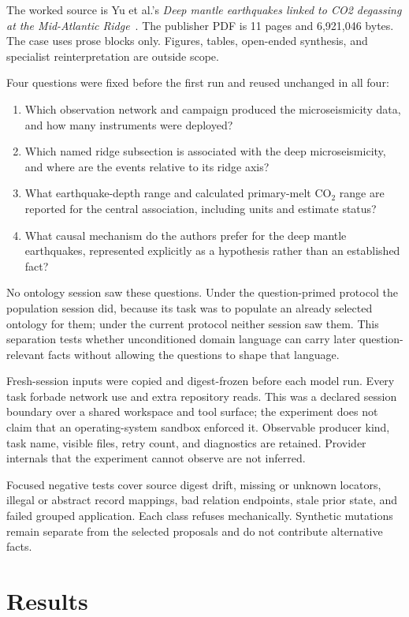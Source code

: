 \documentclass[10pt]{article}
\begin{document}
The worked source is Yu et al.'s \emph{Deep mantle earthquakes linked to CO2 degassing at the Mid-Atlantic Ridge}~\citep{yu2025deep}. The publisher PDF is 11 pages and 6,921,046 bytes. The case uses prose blocks only. Figures, tables, open-ended synthesis, and specialist reinterpretation are outside scope.

Four questions were fixed before the first run and reused unchanged in all four:
\begin{enumerate}
\item Which observation network and campaign produced the microseismicity data, and how many instruments were deployed?
\item Which named ridge subsection is associated with the deep microseismicity, and where are the events relative to its ridge axis?
\item What earthquake-depth range and calculated primary-melt CO$_2$ range are reported for the central association, including units and estimate status?
\item What causal mechanism do the authors prefer for the deep mantle earthquakes, represented explicitly as a hypothesis rather than an established fact?
\end{enumerate}

No ontology session saw these questions. Under the question-primed protocol the population session did, because its task was to populate an already selected ontology for them; under the current protocol neither session saw them. This separation tests whether unconditioned domain language can carry later question-relevant facts without allowing the questions to shape that language.

Fresh-session inputs were copied and digest-frozen before each model run. Every task forbade network use and extra repository reads. This was a declared session boundary over a shared workspace and tool surface; the experiment does not claim that an operating-system sandbox enforced it. Observable producer kind, task name, visible files, retry count, and diagnostics are retained. Provider internals that the experiment cannot observe are not inferred.

Focused negative tests cover source digest drift, missing or unknown locators, illegal or abstract record mappings, bad relation endpoints, stale prior state, and failed grouped application. Each class refuses mechanically. Synthetic mutations remain separate from the selected proposals and do not contribute alternative facts.

\section{Results}
\end{document}
